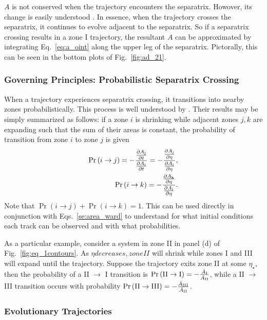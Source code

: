\documentclass[
        fleqn,
        usenatbib,
        referee,
    ]{mnras}
\newcommand*{\pd}[2]{\frac{\partial#1}{\partial#2}}
\newcommand*{\p}[1]{\left(#1\right)}
\begin{document}
$A$ is not conserved when the trajectory encounters the separatrix. Howover, its
change is easily understood \citep{henrard1982}. In essence, when the trajectory
crosses the separatrix, it continues to evolve adjacent to the separatrix. So if
a separatrix crossing results in a zone I trajectory, the resultant $A$ can be
approximated by integrating Eq.~\eqref{eq:a_oint} along the upper leg of the
separatrix. Pictorally, this can be seen in the bottom plots of
Fig.~\ref{fig:ad_21}.

\subsubsection{Governing Principles: Probabilistic Separatrix Crossing}

When a trajectory experiences separatrix crossing, it transitions into nearby
zones probabilistically. This process is well understood by
\citealp{henrard1982,henrard1987}. Their results may be simply summarized as
follows: if a zone $i$ is shrinking while adjacent zones $j, k$ are expanding
such that the sum of their areas is constant, the probability of transition from
zone $i$ to zone $j$ is given
\begin{align}
    \Pr\p{i \to j} = -\frac{\pd{A_{\rm j}}{t}}{ \pd{A_{\rm i}}{t}}
        = -\frac{\pd{A_{\rm j}}{\eta}}{ \pd{A_{\rm i}}{\eta}},\\
    \Pr\p{i \to k}
        = -\frac{\pd{A_{\rm k}}{\eta}}{ \pd{A_{\rm i}}{\eta}}.\label{eq:henrard_hop}
\end{align}
Note that $\Pr \p{i \to j} + \Pr\p{i \to k} = 1$. This can be used directly in
conjunction with Eqs.~\eqref{se:area_ward} to understand for what initial
conditions each track can be observed and with what probabilities.

As a particular example, consider a system in zone II in panel (d) of
Fig.~\ref{fig:eq_1contours}. As $\eta decreases, zone II$ will shrink while
zones I and III will expand until the trajectory. Suppose the trajectory
exits zone II at some $\eta_\star$, then the probability of a II $\to$ I
transition is $\Pr\p{\rm II \to I} = -\frac{\dot{A}_{\rm I}}{\dot{A}_{\rm II}}$,
while a II $\to$ III transition occurs with probability $\Pr\p{\rm II \to III} =
-\frac{\dot{A}_{\rm III}}{\dot{A}_{\rm II}}$.

\subsubsection{Evolutionary Trajectories}\label{sss:evol_traj}
\end{document}
